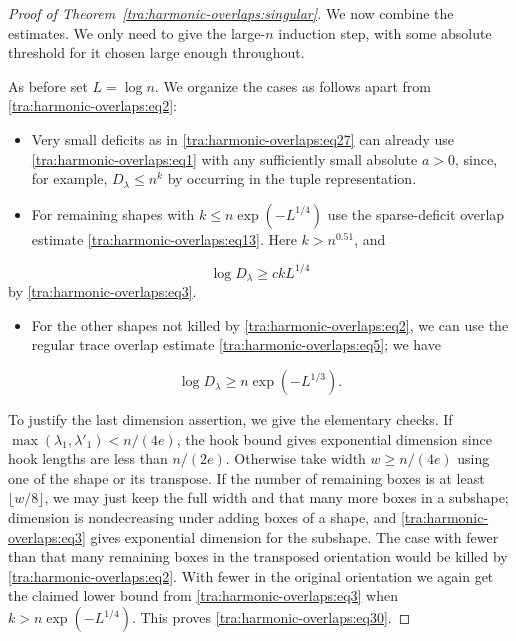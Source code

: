 \begin{proof}[Proof of Theorem~\ref{tra:harmonic-overlaps:singular}]

\label{tra:harmonic-overlaps:deficit-ranges-and-dimensions}
We now combine the estimates. We only need to give the large-\(n\) induction step, with some absolute threshold for it chosen large enough throughout.

As before set \(L=\log n\). We organize the cases as follows apart from \eqref{tra:harmonic-overlaps:eq2}:
\begin{itemize}
\item Very small deficits as in \eqref{tra:harmonic-overlaps:eq27} can already use \eqref{tra:harmonic-overlaps:eq1} with any sufficiently small absolute \(a>0\), since, for example, \(D_\lambda\le n^k\) by occurring in the tuple representation.
\item For remaining shapes with \(k\le n\exp(-L^{1/4})\) use the sparse-deficit overlap estimate \eqref{tra:harmonic-overlaps:eq13}. Here \(k>n^{0.51}\), and
\end{itemize}
\begin{equation}
                          \log D_\lambda\ge c k L^{1/4}                  \label{tra:harmonic-overlaps:eq29}
\end{equation}
by \eqref{tra:harmonic-overlaps:eq3}.
\begin{itemize}
\item For the other shapes not killed by \eqref{tra:harmonic-overlaps:eq2}, we can use the regular trace overlap estimate \eqref{tra:harmonic-overlaps:eq5}; we have
\end{itemize}
\begin{equation}
                          \log D_\lambda\ge n\exp(-L^{1/3}).             \label{tra:harmonic-overlaps:eq30}
\end{equation}

To justify the last dimension assertion, we give the elementary checks. If \(\max(\lambda_1,\lambda'_1)< n/(4e)\), the hook bound gives exponential dimension since hook lengths are less than \(n/(2e)\). Otherwise take width \(w\ge n/(4e)\) using one of the shape or its transpose. If the number of remaining boxes is at least \(\lfloor w/8\rfloor\), we may just keep the full width and that many more boxes in a subshape; dimension is nondecreasing under adding boxes of a shape, and \eqref{tra:harmonic-overlaps:eq3} gives exponential dimension for the subshape. The case with fewer than that many remaining boxes in the transposed orientation would be killed by \eqref{tra:harmonic-overlaps:eq2}. With fewer in the original orientation we again get the claimed lower bound from \eqref{tra:harmonic-overlaps:eq3} when \(k> n\exp(-L^{1/4})\). This proves \eqref{tra:harmonic-overlaps:eq30}.


\end{proof}

